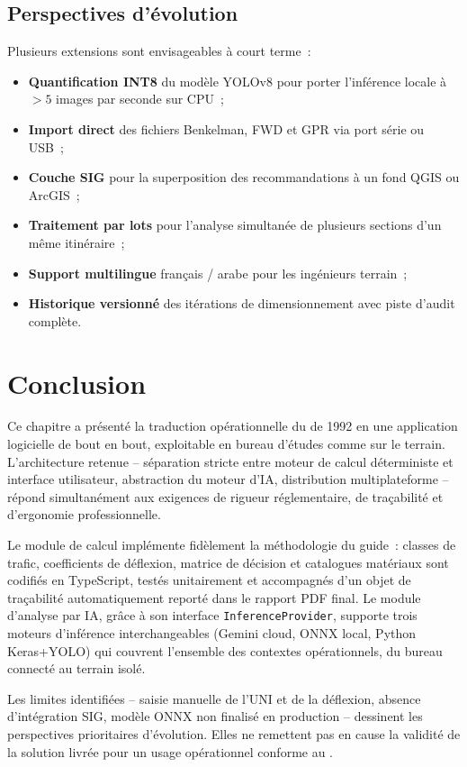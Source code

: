 \subsection{Perspectives d'évolution}
\label{sec:perspectives}

Plusieurs extensions sont envisageables à court terme~:

\begin{itemize}
  \item \textbf{Quantification INT8} du modèle YOLOv8 pour porter
        l'inférence locale à $> 5$ images par seconde sur CPU~;
  \item \textbf{Import direct} des fichiers Benkelman, FWD et GPR via
        port série ou USB~;
  \item \textbf{Couche SIG} pour la superposition des
        recommandations à un fond QGIS ou ArcGIS~;
  \item \textbf{Traitement par lots} pour l'analyse simultanée de
        plusieurs sections d'un même itinéraire~;
  \item \textbf{Support multilingue} français / arabe pour les
        ingénieurs terrain~;
  \item \textbf{Historique versionné} des itérations de
        dimensionnement avec piste d'audit complète.
\end{itemize}


\section{Conclusion}
\label{sec:conclusion-chap}

Ce chapitre a présenté la traduction opérationnelle du \cttp{} de
1992 en une application logicielle de bout en bout, exploitable en
bureau d'études comme sur le terrain. L'architecture retenue --
séparation stricte entre moteur de calcul déterministe et interface
utilisateur, abstraction du moteur d'IA, distribution
multiplateforme -- répond simultanément aux exigences de rigueur
réglementaire, de traçabilité et d'ergonomie professionnelle.

Le module de calcul implémente fidèlement la méthodologie du guide~:
classes de trafic, coefficients de déflexion, matrice de décision et
catalogues matériaux sont codifiés en TypeScript, testés
unitairement et accompagnés d'un objet de traçabilité
automatiquement reporté dans le rapport PDF final. Le module d'analyse
par IA, grâce à son interface \texttt{InferenceProvider}, supporte
trois moteurs d'inférence interchangeables (Gemini cloud, ONNX local, Python
Keras+YOLO) qui couvrent l'ensemble des contextes opérationnels,
du bureau connecté au terrain isolé.

Les limites identifiées -- saisie manuelle de l'UNI et de la
déflexion, absence d'intégration SIG, modèle ONNX non finalisé en
production -- dessinent les perspectives prioritaires d'évolution.
Elles ne remettent pas en cause la validité de la solution livrée
pour un usage opérationnel conforme au \cttp{}.
